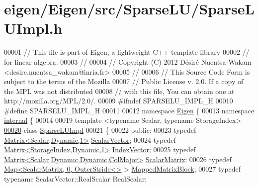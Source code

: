 \hypertarget{eigen_2_eigen_2src_2_sparse_l_u_2_sparse_l_u_impl_8h_source}{}\section{eigen/\+Eigen/src/\+Sparse\+L\+U/\+Sparse\+L\+U\+Impl.h}
\label{eigen_2_eigen_2src_2_sparse_l_u_2_sparse_l_u_impl_8h_source}

\begin{DoxyCode}
00001 \textcolor{comment}{// This file is part of Eigen, a lightweight C++ template library}
00002 \textcolor{comment}{// for linear algebra.}
00003 \textcolor{comment}{//}
00004 \textcolor{comment}{// Copyright (C) 2012 Désiré Nuentsa-Wakam <desire.nuentsa\_wakam@inria.fr>}
00005 \textcolor{comment}{//}
00006 \textcolor{comment}{// This Source Code Form is subject to the terms of the Mozilla}
00007 \textcolor{comment}{// Public License v. 2.0. If a copy of the MPL was not distributed}
00008 \textcolor{comment}{// with this file, You can obtain one at http://mozilla.org/MPL/2.0/.}
00009 \textcolor{preprocessor}{#ifndef SPARSELU\_IMPL\_H}
00010 \textcolor{preprocessor}{#define SPARSELU\_IMPL\_H}
00011 
00012 \textcolor{keyword}{namespace }\hyperlink{namespace_eigen}{Eigen} \{
00013 \textcolor{keyword}{namespace }\hyperlink{namespaceinternal}{internal} \{
00014   
00019 \textcolor{keyword}{template} <\textcolor{keyword}{typename} Scalar, \textcolor{keyword}{typename} StorageIndex>
\hyperlink{group___sparse_l_u___module}{00020} \textcolor{keyword}{class }\hyperlink{group___sparse_l_u___module_class_eigen_1_1internal_1_1_sparse_l_u_impl}{SparseLUImpl}
00021 \{
00022   \textcolor{keyword}{public}:
00023     \textcolor{keyword}{typedef} \hyperlink{group___core___module}{Matrix<Scalar,Dynamic,1>} \hyperlink{group___core___module}{ScalarVector};
00024     \textcolor{keyword}{typedef} \hyperlink{group___core___module}{Matrix<StorageIndex,Dynamic,1>} 
      \hyperlink{group___core___module}{IndexVector}; 
00025     \textcolor{keyword}{typedef} \hyperlink{group___core___module_class_eigen_1_1_matrix}{Matrix<Scalar,Dynamic,Dynamic,ColMajor>} 
      \hyperlink{group___core___module_class_eigen_1_1_matrix}{ScalarMatrix};
00026     \textcolor{keyword}{typedef} \hyperlink{group___core___module_class_eigen_1_1_map}{Map<ScalarMatrix, 0,  OuterStride<>} > 
      \hyperlink{group___core___module_class_eigen_1_1_map}{MappedMatrixBlock};
00027     \textcolor{keyword}{typedef} \textcolor{keyword}{typename} ScalarVector::RealScalar RealScalar; 

\end{DoxyCode}
